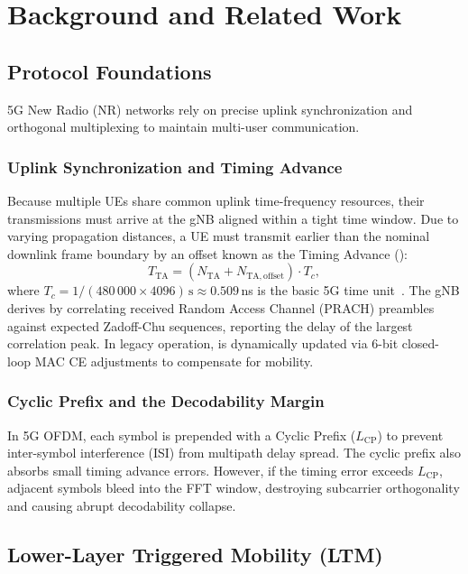 \chapter{Background and Related Work}
\label{ch:lit}

\section{Protocol Foundations}
\label{sec:background}

5G New Radio (NR) networks rely on precise uplink synchronization and orthogonal multiplexing to
maintain multi-user communication.

\subsection{Uplink Synchronization and Timing Advance}
Because multiple UEs share common uplink time-frequency resources, their transmissions must arrive at
the gNB aligned within a tight time window. Due to varying propagation distances, a UE must transmit
earlier than the nominal downlink frame boundary by an offset known as the Timing Advance (\TA{}):
\begin{equation}
  T_\mathrm{TA} = (N_\mathrm{TA} + N_{\mathrm{TA,offset}}) \cdot T_c ,
  \label{eq:ta_def}
\end{equation}
where $T_c = 1/(480\,000 \times 4096)\,\text{s} \approx 0.509$\,ns is the basic 5G time unit~\cite{3gpp38211}.
The gNB derives \TA{} by correlating received Random Access Channel (PRACH) preambles against expected
Zadoff-Chu sequences, reporting the delay of the largest correlation peak. In legacy operation, \TA{} is
dynamically updated via 6-bit closed-loop MAC CE adjustments to compensate for mobility.

\subsection{Cyclic Prefix and the Decodability Margin}
In 5G OFDM, each symbol is prepended with a Cyclic Prefix ($L_{\mathrm{CP}}$) to prevent inter-symbol
interference (ISI) from multipath delay spread. The cyclic prefix also absorbs small timing advance
errors. However, if the timing error exceeds $L_{\mathrm{CP}}$, adjacent symbols bleed into the FFT
window, destroying subcarrier orthogonality and causing abrupt decodability collapse.

\section{Lower-Layer Triggered Mobility (LTM)}
\label{sec:ltm}

